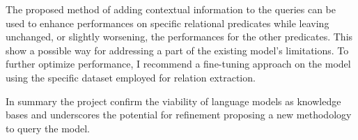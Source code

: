 \documentclass{article}
\begin{document}
The proposed method of adding contextual information to the queries can be used to enhance performances on specific relational predicates while leaving unchanged, or slightly worsening, the performances for the other predicates. This show a possible way for addressing a part of the existing model's limitations. To further optimize performance, I recommend a fine-tuning approach on the model using the specific dataset employed for relation extraction.

In summary the project confirm the viability of language models as knowledge bases and underscores the potential for refinement proposing a new methodology to query the model.




\end{document}
